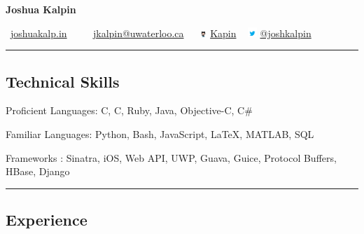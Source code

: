 \documentclass[10pt,letterpaper]{article}
\newenvironment{indentsection}[1]%
{\begin{list}{}%
	{\setlength{\leftmargin}{#1}}%
	\item[]%
}
{\end{list}}
\newcommand{\CPP}
{C\nolinebreak[4]\hspace{-.05em}\raisebox{.22ex}{\footnotesize\bf ++}}
\begin{document}
\begin{center}
{\LARGE \textbf{Joshua Kalpin}}
\vspace{0.1cm}

\Mundus \ \href{http://joshuakalp.in}{joshuakalp.in} \ \textbullet
\ \ \Letter \ \href{mailto:jkalpin@uwaterloo.ca}{jkalpin@uwaterloo.ca} \ \textbullet
\ \includegraphics[height=6pt]{Resources/Octocat} 
\href{https://github.com/kapin}{Kapin} \ \textbullet
 \includegraphics[height=10pt]{Resources/twitter}
\href{https://twitter.com/joshkalpin}{@joshkalpin}
\end{center}

\hrule
\vspace{-0.4em}
\subsection*{Technical Skills}

\begin{indentsection}{\parindent}
\begin{description*}
	\item[Proficient Languages:]
	C, \CPP, Ruby, Java, Objective-C, C\#
	\item[Familiar Languages:]
	Python, Bash, JavaScript, \LaTeX, MATLAB, SQL
	\item[Frameworks]:
	Sinatra, iOS, Web API, UWP, Guava, Guice, Protocol Buffers, HBase, Django
\end{description*}
\end{indentsection}

\hrule
\vspace{-0.4em}
\subsection*{Experience}
\end{document}
